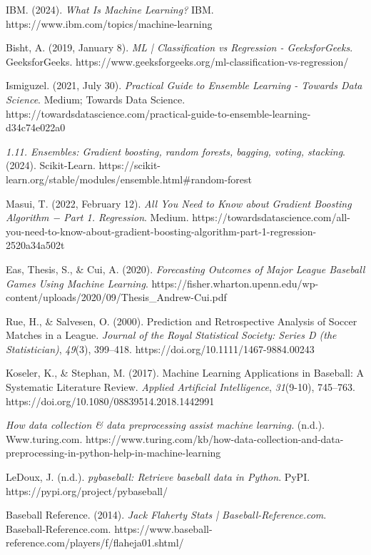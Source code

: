 \documentclass[10pt,twocolumn]{article}
\begin{document}
\cite{3} IBM. (2024). \textit{What Is Machine Learning?} IBM. https://www.ibm.com/topics/machine-learning

\cite{4} Bisht, A. (2019, January 8). \textit{ML | Classification vs Regression - GeeksforGeeks}. GeeksforGeeks. https://www.geeksforgeeks.org/ml-classification-vs-regression/

\cite{5} Ismiguzel. (2021, July 30). \textit{Practical Guide to Ensemble Learning - Towards Data Science}. Medium; Towards Data Science. https://towardsdatascience.com/practical-guide-to-ensemble-learning-d34c74e022a0

\cite{6} \textit{1.11. Ensembles: Gradient boosting, random forests, bagging, voting, stacking}. (2024). Scikit-Learn. https://scikit-learn.org/stable/modules/ensemble.html\#random-forest

\cite{7} Masui, T. (2022, February 12). \textit{All You Need to Know about Gradient Boosting Algorithm − Part 1. Regression}. Medium. https://towardsdatascience.com/all-you-need-to-know-about-gradient-boosting-algorithm-part-1-regression-2520a34a502t

\cite{8} Eas, Thesis, S., \& Cui, A. (2020). \textit{Forecasting Outcomes of Major League Baseball Games Using Machine Learning}. https://fisher.wharton.upenn.edu/wp-content/uploads/2020/09/Thesis\_Andrew-Cui.pdf

\cite{9} Rue, H., \& Salvesen, O. (2000). Prediction and Retrospective Analysis of Soccer Matches in a League. \textit{Journal of the Royal Statistical Society: Series D (the Statistician)}, \textit{49}(3), 399–418. https://doi.org/10.1111/1467-9884.00243

\cite{10} Koseler, K., \& Stephan, M. (2017). Machine Learning Applications in Baseball: A Systematic Literature Review. \textit{Applied Artificial Intelligence}, \textit{31}(9-10), 745–763. https://doi.org/10.1080/08839514.2018.1442991

\cite{11} \textit{How data collection \& data preprocessing assist machine learning.} (n.d.). Www.turing.com. https://www.turing.com/kb/how-data-collection-and-data-preprocessing-in-python-help-in-machine-learning

\cite{12} LeDoux, J. (n.d.). \textit{pybaseball: Retrieve baseball data in Python}. PyPI. https://pypi.org/project/pybaseball/

\cite{13} Baseball Reference. (2014). \textit{Jack Flaherty Stats | Baseball-Reference.com}. Baseball-Reference.com. https://www.baseball-reference.com/players/f/flaheja01.shtml/
\end{document}
